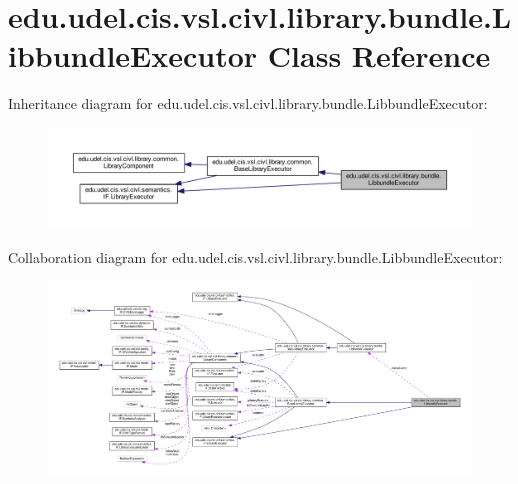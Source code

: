 \hypertarget{classedu_1_1udel_1_1cis_1_1vsl_1_1civl_1_1library_1_1bundle_1_1LibbundleExecutor}{}\section{edu.\+udel.\+cis.\+vsl.\+civl.\+library.\+bundle.\+Libbundle\+Executor Class Reference}
\label{classedu_1_1udel_1_1cis_1_1vsl_1_1civl_1_1library_1_1bundle_1_1LibbundleExecutor}


Inheritance diagram for edu.\+udel.\+cis.\+vsl.\+civl.\+library.\+bundle.\+Libbundle\+Executor\+:
\nopagebreak
\begin{figure}[H]
\begin{center}
\leavevmode
\includegraphics[width=350pt]{classedu_1_1udel_1_1cis_1_1vsl_1_1civl_1_1library_1_1bundle_1_1LibbundleExecutor__inherit__graph}
\end{center}
\end{figure}


Collaboration diagram for edu.\+udel.\+cis.\+vsl.\+civl.\+library.\+bundle.\+Libbundle\+Executor\+:
\nopagebreak
\begin{figure}[H]
\begin{center}
\leavevmode
\includegraphics[width=350pt]{classedu_1_1udel_1_1cis_1_1vsl_1_1civl_1_1library_1_1bundle_1_1LibbundleExecutor__coll__graph}
\end{center}
\end{figure}
